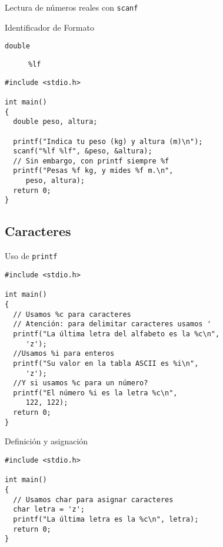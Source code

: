 \documentclass[xcolor={usenames,svgnames,dvipsnames}, aspectratio=169]{beamer}
\begin{document}
\begin{frame}[label={sec:orgcf69871},fragile]{Lectura de números reales con \texttt{scanf}}
 \begin{block}{Identificador de Formato}
\begin{description}
\item[{\texttt{double}}] \texttt{\%lf}
\end{description}

\lstset{language=C,label= ,caption= ,captionpos=b,numbers=none}
\begin{lstlisting}
#include <stdio.h>

int main()
{
  double peso, altura;

  printf("Indica tu peso (kg) y altura (m)\n");
  scanf("%lf %lf", &peso, &altura); 
  // Sin embargo, con printf siempre %f
  printf("Pesas %f kg, y mides %f m.\n",
	 peso, altura); 
  return 0;
}
\end{lstlisting}
\end{block}
\end{frame}


\subsection{Caracteres}
\label{sec:org7564a10}

\begin{frame}[label={sec:org246dc1a},fragile]{Uso de \texttt{printf}}
 \lstset{language=C,label= ,caption= ,captionpos=b,numbers=none}
\begin{lstlisting}
#include <stdio.h>

int main()
{
  // Usamos %c para caracteres
  // Atención: para delimitar caracteres usamos '
  printf("La última letra del alfabeto es la %c\n", 
	 'z');
  //Usamos %i para enteros
  printf("Su valor en la tabla ASCII es %i\n", 
	 'z');
  //Y si usamos %c para un número?
  printf("El número %i es la letra %c\n", 
	 122, 122);
  return 0;
}
\end{lstlisting}
\end{frame}

\begin{frame}[label={sec:orgf07a01b},fragile]{Definición y asignación}
 \lstset{language=C,label= ,caption= ,captionpos=b,numbers=none}
\begin{lstlisting}
#include <stdio.h>

int main()
{
  // Usamos char para asignar caracteres
  char letra = 'z';
  printf("La última letra es la %c\n", letra);
  return 0;
}
\end{lstlisting}
\end{frame}
\end{document}
